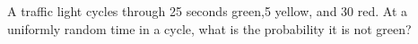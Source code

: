 A traffic light cycles through 25 seconds green,5 yellow, and 30 red. At a uniformly random time in a cycle, what is the probability it is not green?
